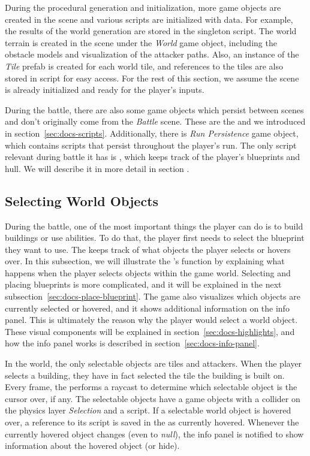 During the procedural generation and initialization, more game objects are created in the scene and various scripts are initialized with data.
For example, the results of the world generation are stored in the  singleton script.
The world terrain is created in the scene under the \emph{World} game object, including the obstacle models and visualization of the attacker paths.
Also, an instance of the \emph{Tile} prefab is created for each world tile, and references to the tiles are also stored in  script for easy access.
For the rest of this section, we assume the scene is already initialized and ready for the player's inputs.

During the battle, there are also some game objects which persist between scenes and don't originally come from the \emph{Battle} scene.
These are the  and  we introduced in section~\ref{sec:docs-scripts}.
Additionally, there is \emph{Run Persistence} game object, which contains scripts that persist throughout the player's run.
The only script relevant during battle it has is , which keeps track of the player's blueprints and hull.
We will describe it in more detail in section .

\subsection{Selecting World Objects}

During the battle, one of the most important things the player can do is to build buildings or use abilities.
To do that, the player first needs to select the blueprint they want to use.
The  keeps track of what objects the player selects or hovers over.
In this subsection, we will illustrate the 's function by explaining what happens when the player selects objects within the game world.
Selecting and placing blueprints is more complicated, and it will be explained in the next subsection~\ref{sec:docs-place-blueprint}.
The game also visualizes which objects are currently selected or hovered, and it shows additional information on the info panel.
This is ultimately the reason why the player would select a world object.
These visual components will be explained in section~\ref{sec:docs-highlights}, and how the info panel works is described in section~\ref{sec:docs-info-panel}.

In the world, the only selectable objects are tiles and attackers.
When the player selects a building, they have in fact selected the tile the building is built on.
Every frame, the  performs a raycast to determine which selectable object is the cursor over, if any.
The selectable objects have a game objects with a collider on the physics layer \emph{Selection} and a  script.
If a selectable world object is hovered over, a reference to its  script is saved in the  as currently hovered.
Whenever the currently hovered object changes (even to \emph{null}), the info panel is notified to show information about the hovered object (or hide).

